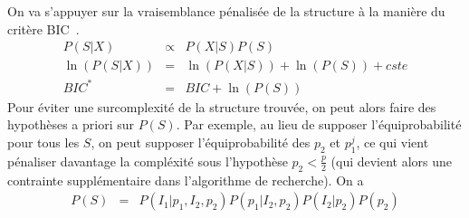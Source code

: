 \documentclass[12pt]{article}
\begin{document}
		On va s'appuyer sur la vraisemblance pénalisée de la structure à la manière du critère BIC~\cite{BIChuard}. 
		\begin{eqnarray}
		P(S|X)&\propto &P(X|S)P(S) \\
		\ln(P(S|X))&=&\ln(P(X|S))+\ln(P(S))+cste \\
		BIC^*&=&BIC +\ln(P(S)) \label{Bicstar}
	\end{eqnarray}	
	Pour éviter une surcomplexité de la structure trouvée, on peut alors faire des hypothèses a priori sur $P(S)$. Par exemple, au lieu de supposer l'équiprobabilité pour tous les $S$, on peut supposer l'équiprobabilité des $p_2$ et $p_1^j$, ce qui vient pénaliser davantage la compléxité sous l'hypothèse $p_2<\frac{p}{2}$ (qui devient alors une contrainte supplémentaire dans l'algorithme de recherche). 
	On a
	\begin{eqnarray}
		P(S)&=&P(I_1 | p_1,I_2,p_2)P(p_1|I_2,p_2)P(I_2|p_2)P(p_2) %
	\end{eqnarray}		
\end{document}
